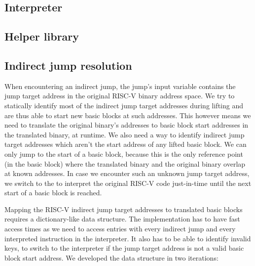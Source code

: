 \documentclass[course=eragp]{aspdoc}
\begin{document}
\subsection{Interpreter}\label{interpreter}
\subsection{Helper library}\label{helper}

\subsection{Indirect jump resolution}
When encountering an indirect jump, the jump's input variable contains the jump target address in the
original RISC-V binary address space. We try to statically identify most of the indirect jump target
addresses during lifting and are thus able to start new basic blocks at such addresses.
This however means we need to translate the original binary's addresses to basic block start
addresses in the translated binary, at runtime. We also need a way to identify
indirect jump target addresses which aren't the start address of any lifted basic block. We can only
jump to the start of a basic block, because this is the only reference point (in the basic block) where the translated
binary and the original binary overlap at known addresses. In case we encounter such an unknown jump
target address, we switch to the  to interpret the original RISC-V code
just-in-time until the next start of a basic block is reached.

\par

Mapping the RISC-V indirect jump target addresses to translated basic blocks requires a
dictionary-like data structure.
The implementation has to have fast access times as we need to access entries with
every indirect jump and every interpreted instruction in the interpreter. It also has to be able
to identify invalid keys, to switch to the interpreter if the
jump target address is not a valid basic block start address. We developed the data structure in two
iterations:
\end{document}
